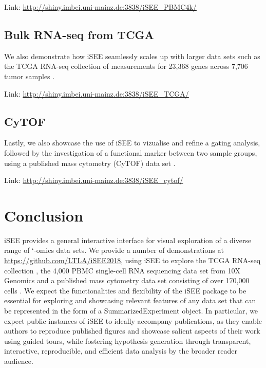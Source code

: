 \documentclass[10pt,a4paper,twocolumn]{article}
\begin{document}
Link: \url{http://shiny.imbei.uni-mainz.de:3838/iSEE_PBMC4k/}

\subsection*{Bulk RNA-seq from TCGA}
We also demonstrate how iSEE seamlessly scales up with larger data sets such as the TCGA RNA-seq collection of measurements for 23,368 genes across 7,706 tumor samples \citep{piccolo2015TCGA}.

Link: \url{http://shiny.imbei.uni-mainz.de:3838/iSEE_TCGA/}

\subsection*{CyTOF}
Lastly, we also showcase the use of iSEE to vizualise and refine a gating analysis, followed by the investigation of a functional marker between two sample groups, using a published mass cytometry (CyTOF) data set \citep{bodenmiller2012cytof}.

Link: \url{http://shiny.imbei.uni-mainz.de:3838/iSEE_cytof/}

\section*{Conclusion}
iSEE provides a general interactive interface for visual exploration of a diverse range of `-omics data sets.
We provide a number of demonstrations at \url{https://github.com/LTLA/iSEE2018}, using iSEE to explore the TCGA RNA-seq collection \citep{piccolo2015TCGA}, the 4,000 PBMC single-cell RNA sequencing data set from 10X Genomics \citep{zheng2017massively} and a published mass cytometry data set consisting of over 170,000 cells \citep{bodenmiller2012cytof}.
We expect the functionalities and flexibility of the iSEE package to be essential for exploring and showcasing relevant features of any data set that can be represented in the form of a SummarizedExperiment object.
In particular, we expect public instances of iSEE to ideally accompany publications, as they enable authors to reproduce published figures and showcase salient aspects of their work using guided tours, while fostering hypothesis generation through transparent, interactive, reproducible, and efficient data analysis by the broader reader audience.
\end{document}
